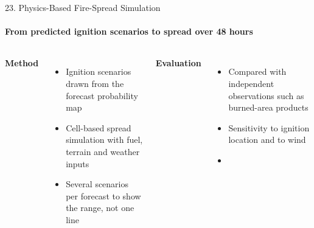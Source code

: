 \begin{frame}{23. Physics-Based Fire-Spread Simulation}
\framesubtitle{From predicted ignition scenarios to spread over 48 hours}
\scriptsize
\begin{columns}[T,onlytextwidth]
    \textbf{\textcolor{amritaMaroon}{Method}}
    \begin{itemize}\setlength\itemsep{2pt}
        \item Ignition scenarios drawn from the forecast probability map
        \item Cell-based spread simulation with fuel, terrain and weather inputs
        \item Several scenarios per forecast to show the range, not one line
    \end{itemize}
    \textbf{\textcolor{amritaMaroon}{Evaluation}}
    \begin{itemize}\setlength\itemsep{2pt}
        \item Compared with independent observations such as burned-area products
        \item Sensitivity to ignition location and to wind
        \item {}
    \end{itemize}
\end{columns}
\end{frame}

